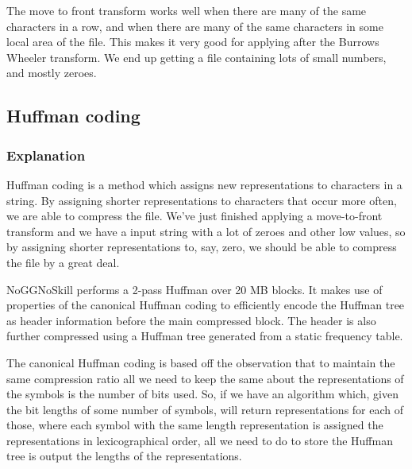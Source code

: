 \documentclass[a4paper]{article}
\begin{document}
\begin{multicols}{2}
The move to front transform works well when there are many of the same characters in a row, and when there are many of the same characters in some local area of the file. This makes it very good for applying after the Burrows Wheeler transform. We end up getting a file containing lots of small numbers, and mostly zeroes.
\subsection{Huffman coding}
\subsubsection{Explanation}
Huffman coding \cite{4051119} is a method which assigns new representations to characters in a string. By assigning shorter representations to characters that occur more often, we are able to compress the file. We've just finished applying a move-to-front transform and we have a input string with a lot of zeroes and other low values, so by assigning shorter representations to, say, zero, we should be able to compress the file by a great deal.

NoGGNoSkill performs a 2-pass Huffman over 20 MB blocks. It makes use of properties of the canonical Huffman coding \cite{Schwartz:1964:GCP:363958.363991} to efficiently encode the Huffman tree as header information before the main compressed block. The header is also further compressed using a Huffman tree generated from a static frequency table.

The canonical Huffman coding is based off the observation that to maintain the same compression ratio all we need to keep the same about the representations of the symbols is the number of bits used. So, if we have an algorithm which, given the bit lengths of some number of symbols, will return representations for each of those, where each symbol with the same length representation is assigned the representations in lexicographical order, all we need to do to store the Huffman tree is output the lengths of the representations.

\end{multicols}
\end{document}
